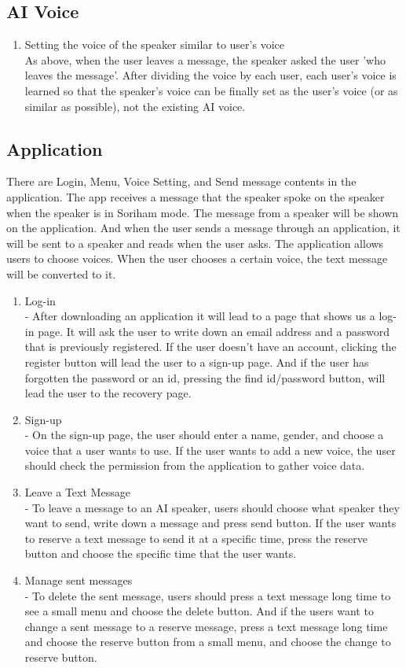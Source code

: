 \documentclass[conference]{IEEEtran}
\begin{document}
\subsection{AI Voice}
\begin{enumerate}
    \item Setting the voice of the speaker similar to user's voice\\
    As above, when the user leaves a message, the speaker asked the user 'who leaves the message'. After dividing the voice by each user, each user's voice is learned so that the speaker's voice can be finally set as the user's voice (or as similar as possible), not the existing AI voice.
\end{enumerate}
\clearpage
\subsection{Application}
There are Login, Menu, Voice Setting, and Send message contents in the application. The app receives a message that the speaker spoke on the speaker when the speaker is in Soriham mode. The message from a speaker will be shown on the application. And when the user sends a message through an application, it will be sent to a speaker and reads when the user asks. The application allows users to choose voices. When the user chooses a certain voice, the text message will be converted to it.
\begin{enumerate}
    \item Log-in\\
    - After downloading an application it will lead to a page that shows us a log-in page. It will ask the user to write down an email address and a password that is previously registered. If the user doesn't have an account, clicking the register button will lead the user to a sign-up page. And if the user has forgotten the password or an id, pressing the find id/password button, will lead the user to the recovery page.
    \item Sign-up\\
    - On the sign-up page, the user should enter a name, gender, and choose a voice that a user wants to use. If the user wants to add a new voice, the user should check the permission from the application to gather voice data.
    \item Leave a Text Message\\
    - To leave a message to an AI speaker, users should choose what speaker they want to send, write down a message and press send button. If the user wants to reserve a text message to send it at a specific time, press the reserve button and choose the specific time that the user wants.
    \item Manage sent messages\\
    - To delete the sent message, users should press a text message long time to see a small menu and choose the delete button. And if the users want to change a sent message to a reserve message, press a text message long time and choose the reserve button from a small menu, and choose the change to reserve button.
\end{enumerate}
\end{document}
